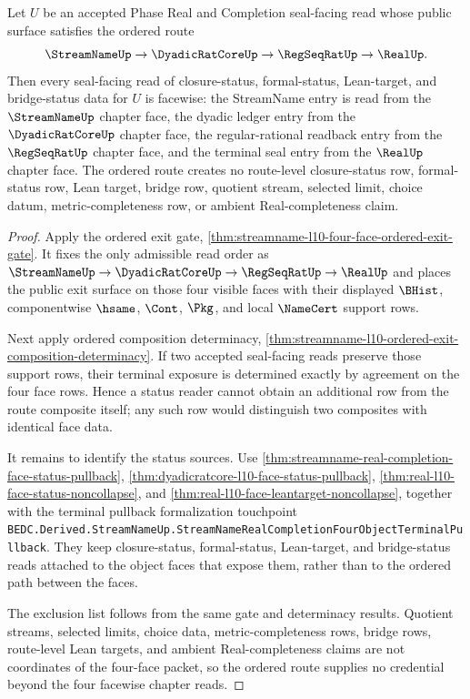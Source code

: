 \begin{theorem}
\label{thm:streamname-l10-ordered-exit-face-status-readback}
Let $U$ be an accepted Phase Real and Completion seal-facing read whose public surface satisfies the ordered route
$$
\StreamNameUp \to \DyadicRatCoreUp \to \RegSeqRatUp \to \RealUp .
$$
Then every seal-facing read of closure-status, formal-status, Lean-target, and bridge-status data for $U$ is facewise: the StreamName entry is read from the $\StreamNameUp$ chapter face, the dyadic ledger entry from the $\DyadicRatCoreUp$ chapter face, the regular-rational readback entry from the $\RegSeqRatUp$ chapter face, and the terminal seal entry from the $\RealUp$ chapter face. The ordered route creates no route-level closure-status row, formal-status row, Lean target, bridge row, quotient stream, selected limit, choice datum, metric-completeness row, or ambient Real-completeness claim.
\end{theorem}
\begin{proof}
Apply the ordered exit gate, \autoref{thm:streamname-l10-four-face-ordered-exit-gate}. It fixes the only admissible read order as $\StreamNameUp \to \DyadicRatCoreUp \to \RegSeqRatUp \to \RealUp$ and places the public exit surface on those four visible faces with their displayed $\BHist$, componentwise $\hsame$, $\Cont$, $\Pkg$, and local $\NameCert$ support rows.

Next apply ordered composition determinacy, \autoref{thm:streamname-l10-ordered-exit-composition-determinacy}. If two accepted seal-facing reads preserve those support rows, their terminal exposure is determined exactly by agreement on the four face rows. Hence a status reader cannot obtain an additional row from the route composite itself; any such row would distinguish two composites with identical face data.

It remains to identify the status sources. Use \autoref{thm:streamname-real-completion-face-status-pullback}, \autoref{thm:dyadicratcore-l10-face-status-pullback}, \autoref{thm:real-l10-face-status-noncollapse}, and \autoref{thm:real-l10-face-leantarget-noncollapse}, together with the terminal pullback formalization touchpoint \texttt{BEDC.Derived.StreamNameUp.StreamNameRealCompletionFourObjectTerminalPullback}. They keep closure-status, formal-status, Lean-target, and bridge-status reads attached to the object faces that expose them, rather than to the ordered path between the faces.

The exclusion list follows from the same gate and determinacy results. Quotient streams, selected limits, choice data, metric-completeness rows, bridge rows, route-level Lean targets, and ambient Real-completeness claims are not coordinates of the four-face packet, so the ordered route supplies no credential beyond the four facewise chapter reads.
\end{proof}

